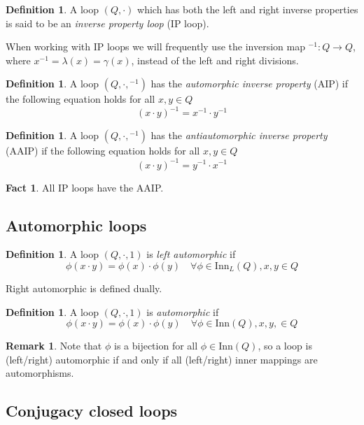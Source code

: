 \documentclass[12pt]{report}
\theoremstyle{definition}
\newtheorem{fct}[thm]{Fact}
\newtheorem{dfn}[thm]{Definition}
\newtheorem*{rmk}{Remark}
\newcommand{\inn}{\text{Inn}}       %
\begin{document}
\begin{dfn}
  A loop $(Q, \cdot)$ which has both the left and right inverse properties is said to be an \emph{inverse property loop}
    (IP loop).
\end{dfn}

When working with IP loops we will frequently use the inversion map ${}^{-1}:Q\to Q$, where
  $x^{-1} = \lambda(x) = \gamma(x)$, instead of the left and right divisions.

\begin{dfn}
  A loop $(Q, \cdot, {}^{-1})$ has the \emph{automorphic inverse property} (AIP) if the following equation holds
    for all $x, y\in Q$
  \[(x\cdot y)^{-1} = x^{-1}\cdot y^{-1}\]
\end{dfn}

\begin{dfn}
  A loop $(Q, \cdot, {}^{-1})$ has the \emph{antiautomorphic inverse property} (AAIP) if the following equation
    holds for all $x, y\in Q$
  \[(x\cdot y)^{-1} = y^{-1}\cdot x^{-1}\]
\end{dfn}

\begin{fct}
  All IP loops have the AAIP.
\end{fct}

\subsection{Automorphic loops}

\begin{dfn}
  A loop $(Q, \cdot, 1)$ is \emph{left automorphic} if
  \[\phi(x\cdot y) = \phi(x)\cdot \phi(y)\quad \forall \phi\in\inn_L(Q), x, y\in Q\]
\end{dfn}

Right automorphic is defined dually.

\begin{dfn}
  A loop $(Q, \cdot, 1)$ is \emph{automorphic} if
  \[\phi(x\cdot y) = \phi(x)\cdot \phi(y)\quad \forall \phi\in\inn(Q), x, y,\in Q\]
\end{dfn}

\begin{rmk}
  Note that $\phi$ is a bijection for all $\phi\in\inn(Q)$, so a loop is (left/right) automorphic if and only if
    all (left/right) inner mappings are automorphisms.
\end{rmk}

\subsection{Conjugacy closed loops}
\end{document}

